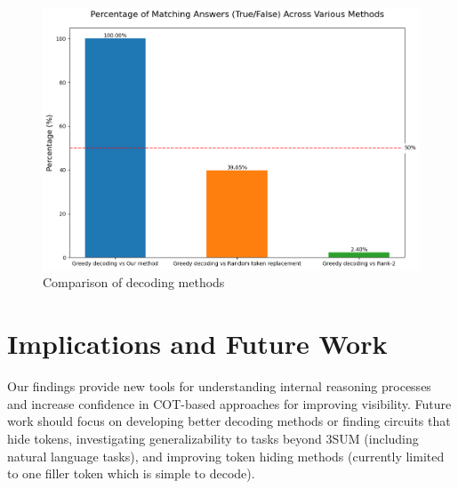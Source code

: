 \documentclass[10pt,a4paper]{article}
\begin{document}
\begin{figure}[H]
\centering
\includegraphics[width=\textwidth]{token_comparison_percentages.png}
\caption{Comparison of decoding methods}
\label{fig:decoding_comparison}
\end{figure}

\section{Implications and Future Work}
Our findings provide new tools for understanding internal reasoning processes and increase confidence in COT-based approaches for improving visibility. Future work should focus on developing better decoding methods or finding circuits that hide tokens, investigating generalizability to tasks beyond 3SUM (including natural language tasks), and improving token hiding methods (currently limited to one filler token which is simple to decode).

\clearpage
\end{document}
